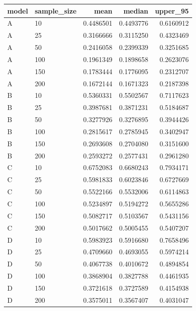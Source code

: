 
\begin{tabular}{llrrr}
\toprule
model & sample\_size & mean & median & upper\_95\\
\midrule
A & 10 & 0.4486501 & 0.4493776 & 0.6160912\\
A & 25 & 0.3166666 & 0.3115250 & 0.4323469\\
A & 50 & 0.2416058 & 0.2399339 & 0.3251685\\
A & 100 & 0.1961349 & 0.1898658 & 0.2623076\\
A & 150 & 0.1783444 & 0.1776095 & 0.2312707\\
\addlinespace
A & 200 & 0.1672144 & 0.1671323 & 0.2187398\\
B & 10 & 0.5360331 & 0.5502567 & 0.7117623\\
B & 25 & 0.3987681 & 0.3871231 & 0.5184687\\
B & 50 & 0.3277926 & 0.3276895 & 0.3944426\\
B & 100 & 0.2815617 & 0.2785945 & 0.3402947\\
\addlinespace
B & 150 & 0.2693608 & 0.2704080 & 0.3151600\\
B & 200 & 0.2593272 & 0.2577431 & 0.2961280\\
C & 10 & 0.6752083 & 0.6680243 & 0.7934171\\
C & 25 & 0.5981833 & 0.6023846 & 0.6727669\\
C & 50 & 0.5522166 & 0.5532006 & 0.6114863\\
\addlinespace
C & 100 & 0.5234897 & 0.5194272 & 0.5655286\\
C & 150 & 0.5082717 & 0.5103567 & 0.5431156\\
C & 200 & 0.5017662 & 0.5005455 & 0.5407207\\
D & 10 & 0.5983923 & 0.5916680 & 0.7658496\\
D & 25 & 0.4709660 & 0.4693055 & 0.5974214\\
\addlinespace
D & 50 & 0.4067738 & 0.4010672 & 0.4894854\\
D & 100 & 0.3868904 & 0.3827788 & 0.4461935\\
D & 150 & 0.3721618 & 0.3727589 & 0.4154938\\
D & 200 & 0.3575011 & 0.3567407 & 0.4031047\\
\bottomrule
\end{tabular}
